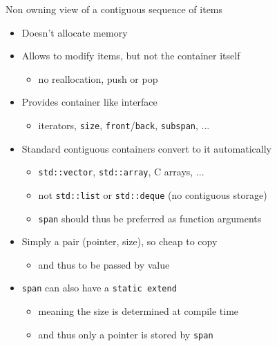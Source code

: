 \begin{frame}[fragile]
  \begin{block}{Non owning view of a contiguous sequence of items}
    \begin{itemize}
    \item Doesn't allocate memory
    \item Allows to modify items, but not the container itself
      \begin{itemize}
      \item no reallocation, push or pop
      \end{itemize}
    \item Provides container like interface
      \begin{itemize}
      \item iterators, \texttt{size}, \texttt{front}/\texttt{back}, \texttt{subspan}, ...
      \end{itemize}
    \item Standard contiguous containers convert to it automatically
      \begin{itemize}
      \item \texttt{std::vector}, \texttt{std::array}, C arrays, ...
      \item not \texttt{std::list} or \texttt{std::deque} (no contiguous storage)
      \item \texttt{span} should thus be preferred as function arguments
      \end{itemize}
    \item Simply a pair (pointer, size), so cheap to copy
      \begin{itemize}
      \item and thus to be passed by value
      \end{itemize}
    \item \texttt{span} can also have a \texttt{static extend}
      \begin{itemize}
      \item meaning the size is determined at compile time
      \item and thus only a pointer is stored by \texttt{span}
      \end{itemize}
    \end{itemize}
  \end{block}
\end{frame}

